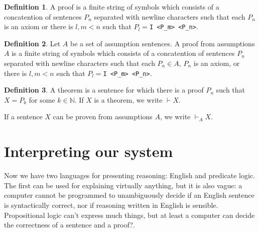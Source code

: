 \documentclass[11pt,oneside,%
]{memoir}
\theoremstyle{definition}
\newtheorem{maaritelma}{Definition}
\newcommand{\NN}{\mathbb{N}}
\newcommand{\propositio}{\lstinline[language=propositio]}
\begin{document}
\begin{maaritelma}
A proof is a finite string of symbols which consists of a concatention of sentences \(P_n\) separated with newline characters such that each \(P_n\) is an axiom or there is \(l,m<n\) such that \(P_l=\)\lstinline[language=propositio]!I <P_m> <P_n>!.
\end{maaritelma}
\begin{maaritelma}
Let \(A\) be a set of assumption sentences. A proof from assumptions \(A\) is a finite string of symbols which consists of a concatention of sentences \(P_n\) separated with newline characters such that each \(P_n\in A\), \(P_n\) is an axiom,  or there is \(l,m<n\) such that \(P_l=\)\lstinline[language=propositio]!I <P_m> <P_n>!.
\end{maaritelma}
\begin{maaritelma}
A theorem is a sentence for which there is a proof \(P_n\) such that \(X=P_k\) for some \(k\in\NN\). If \(X\) is a theorem, we write \(\vdash X\).
\end{maaritelma}
If a sentence \(X\) can be proven from assumptions \(A\), we write \(\vdash_A X\).
%
%

%

\section{Interpreting our system}

Now we have two languages for presenting reasoning: English and predicate logic. The first can be used for explaining virtually anything, but it is also vague: a computer cannot be programmed to unambiguously decide if an English sentence is syntactically correct, nor if reasoning written in English is sensible. Propositional logic can't express much things, but at least a computer can decide the correctness of a sentence and a proof?.
\end{document}

